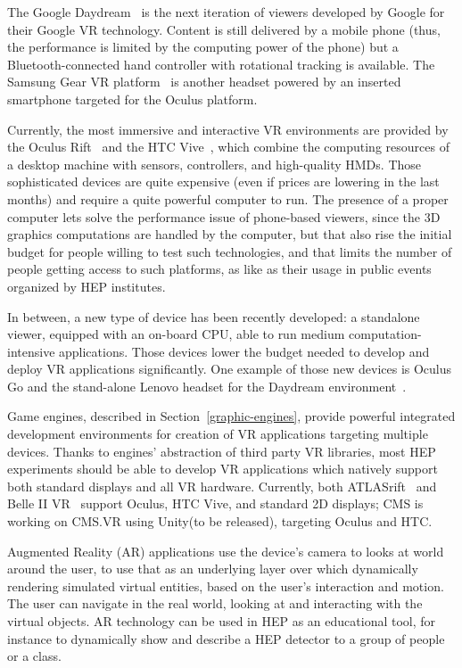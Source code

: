 \documentclass[12pt,a4paper]{article}
\begin{document}
The Google Daydream~\cite{GoogleDaydream} is the next iteration of viewers developed by Google for their Google VR technology.
Content is still delivered by a mobile phone (thus, the performance is limited by the computing power of the phone) but a
Bluetooth-connected hand controller with rotational tracking is available. The Samsung Gear VR platform~\cite{SamsungGearVR}
is another headset powered by an inserted smartphone targeted for the Oculus platform.

Currently, the most immersive and interactive VR environments are provided by the Oculus Rift~\cite{OculusRift} and the
HTC Vive~\cite{HTCVive}, which combine the computing resources of a desktop machine with sensors, controllers, and high-quality HMDs.
Those sophisticated devices are quite expensive (even if prices are lowering in the last months) and require a quite powerful computer to run.
The presence of a proper computer lets solve the performance issue of phone-based viewers, since the 3D graphics computations are handled
by the computer, but that also rise the initial budget for people willing to test such technologies, and that limits the number of
people getting access to such platforms, as like as their usage in public events organized by HEP institutes.

In between, a new type of device has been recently developed: a standalone viewer, equipped with an on-board CPU, able to run
medium computation-intensive applications. Those devices lower the budget needed to develop and deploy VR applications significantly.
One example of those new devices is Oculus Go\cite{OculusGo} and the stand-alone Lenovo headset for the
Daydream environment~\cite{LenovoMirageSolo}.

Game engines, described in Section~\ref{graphic-engines},  provide powerful integrated development environments for
creation of VR applications targeting multiple devices. Thanks to engines' abstraction of third party VR libraries,
most HEP experiments should be able to develop VR applications which natively support both standard displays and all VR hardware.
Currently, both ATLASrift~\cite{ATLASRift} and Belle II VR~\cite{BelleIIVR} support Oculus, HTC Vive,
and standard 2D displays; CMS is working on CMS.VR using Unity(to be released), targeting Oculus and HTC.

Augmented Reality (AR) applications use the device's camera to looks at world around the user, to use that as an underlying layer
over which dynamically rendering simulated virtual entities, based on the user's interaction and motion. The user can navigate in the real world,
looking at and interacting with the virtual objects. AR technology can be used in HEP as an educational tool, for instance to
dynamically show and describe a HEP detector to a group of people or a class.
\end{document}
